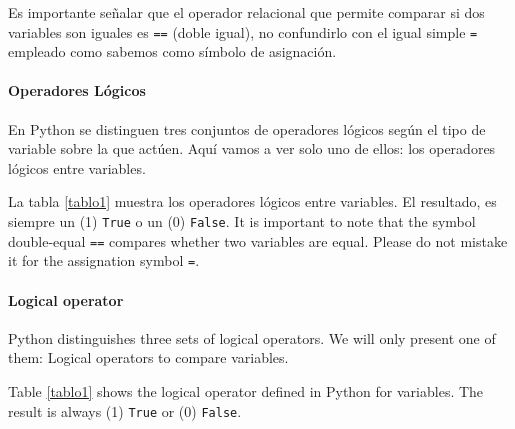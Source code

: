 \begin{paracol}{2}
Es importante señalar que el operador relacional que permite comparar si dos variables son iguales es \texttt{==} (doble igual), no confundirlo con el igual simple \texttt{=} empleado como sabemos como símbolo de asignación.

\paragraph{Operadores Lógicos}
En Python se distinguen tres conjuntos de operadores lógicos según el tipo de variable sobre la que actúen. Aquí vamos a ver solo uno de ellos: los operadores lógicos entre variables.

La tabla \ref{tablo1} muestra los operadores lógicos entre variables. El resultado, es siempre un (1) \texttt{True} o un (0) \texttt{False}.
\switchcolumn
It is important to note that the symbol double-equal \texttt{==} compares whether two variables are equal. Please do not mistake it for the assignation symbol \texttt{=}.

\paragraph{Logical operator} Python distinguishes three sets of logical operators. We will only present one of them: Logical operators to compare variables. 

Table \ref{tablo1} shows the logical operator defined in Python for variables. The result is always (1) \texttt{True} or (0) \texttt{False}.
\end{paracol}

